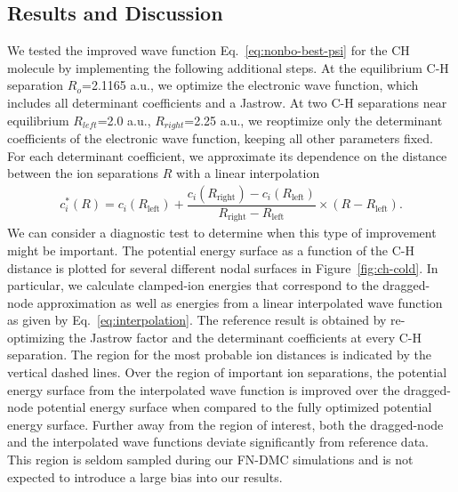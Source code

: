 \subsection{Results and Discussion}
We tested the improved wave function Eq.~\ref{eq:nonbo-best-psi} for the CH molecule by implementing the following additional steps. At the equilibrium C-H separation $R_o$=2.1165 a.u., we optimize the electronic wave function, which includes all determinant coefficients and a Jastrow. At two C-H separations near equilibrium $R_{left}$=2.0 a.u., $R_{right}$=2.25 a.u., we reoptimize only the determinant coefficients of the electronic wave function, keeping all other parameters fixed. For each determinant coefficient, we approximate its dependence on the distance between the ion separations $R$ with a linear interpolation
\begin{align}
c_i^*(R) = c_i(R_{\text{left}}) + 
\dfrac{c_i(R_{\text{right}}) - c_i(R_{\text{left}})}{R_{\text{right}}-R_{\text{left}}}\times(R-R_{\text{left}}). \label{eq:interpolation}
\end{align}
We can consider a diagnostic test to determine when this type of improvement might be important.
The potential energy surface as a function of the C-H distance is plotted for several different nodal surfaces in Figure~\ref{fig:ch-cold}.
In particular, we calculate clamped-ion energies that correspond to the dragged-node approximation as well as energies from a linear interpolated wave function as given by Eq.~\ref{eq:interpolation}.
The reference result is obtained by re-optimizing the Jastrow factor and the determinant coefficients at every C-H separation.
The region for the most probable ion distances is indicated by the vertical dashed lines.
Over the region of important ion separations, the potential energy surface from the interpolated wave function is improved over the dragged-node potential energy surface when compared to the fully optimized potential energy surface.
Further away from the region of interest, both the dragged-node and the interpolated wave functions deviate significantly from reference data.
This region is seldom sampled during our FN-DMC simulations and is not expected to introduce a large bias into our results.

